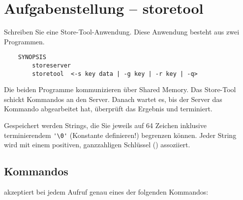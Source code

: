 




\section*{Aufgabenstellung -- storetool}

Schreiben Sie eine Store-Tool-Anwendung. Diese Anwendung besteht aus zwei
Programmen.

\begin{verbatim}
    SYNOPSIS
        storeserver
        storetool  <-s key data | -g key | -r key | -q>
\end{verbatim}

Die beiden Programme kommunizieren über Shared Memory. Das
Store-Tool schickt Kommandos an den Server. Danach wartet es, bis der Server
das Kommando abgearbeitet hat, überprüft das Ergebnis und terminiert.

Gespeichert werden Strings, die Sie jeweils auf 64 Zeichen inklusive
terminierendem \verb_'\0'_ (Konstante definieren!) begrenzen können. Jeder
String wird mit einem positiven, ganzzahligen Schlüssel ()
assoziiert.

\subsection*{Kommandos}

 akzeptiert bei jedem Aufruf genau eines der folgenden
Kommandos:

